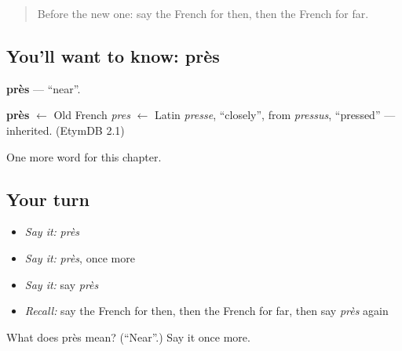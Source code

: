 \label{lesson:FR-C96-pres}



\begin{quote}
Before the new one: say the French for then, then the French for far.
\end{quote}

\subsection*{You'll want to know: près}
\textbf{près} — \textquotedblleft{}near\textquotedblright{}.

\begin{cousinweb}
\textbf{près} $\leftarrow$ Old French \emph{pres} $\leftarrow$ Latin \emph{presse}, \textquotedblleft{}closely\textquotedblright{}, from \emph{pressus}, \textquotedblleft{}pressed\textquotedblright{} — inherited. (EtymDB 2.1)
\end{cousinweb}

\begin{grammarlens}[title={What you've built}]
One more word for this chapter.
\end{grammarlens}

\subsection*{Your turn}
\begin{itemize}
\raggedright
  \item \emph{Say it:} \emph{près}
  \item \emph{Say it:} \emph{près}, once more
  \item \emph{Say it:} say \emph{près}
  \item \emph{Recall:} say the French for then, then the French for far, then say \emph{près} again
\end{itemize}

\begin{tcolorbox}[breakable,colback=teal!4,colframe=teal!35!black,title={Before you move on}]
What does près mean? (\textquotedblleft{}Near\textquotedblright{}.) Say it once more.
\end{tcolorbox}
